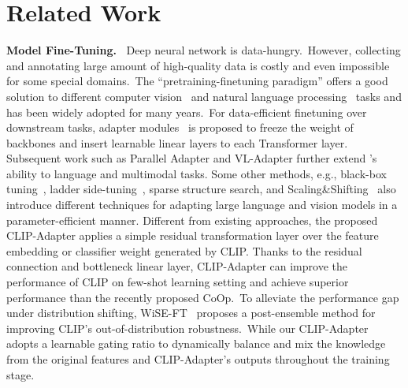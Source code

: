 \documentclass[default,iicol]{sn-jnl}%
\theoremstyle{thmstyleone}%
\theoremstyle{thmstyletwo}%
\theoremstyle{thmstylethree}%
\begin{document}
\section{Related Work}
\noindent\textbf{Model Fine-Tuning.~} Deep neural network is data-hungry.~However, collecting and annotating large amount of high-quality data is costly and even impossible for some special domains.~The ``pretraining-finetuning paradigm'' offers a good solution to different computer vision~\cite{krizhevsky2012imagenet,simonyan2015very,he2016deep} and natural language processing~\cite{devlin2019bert,dong2019unified,conneau2020unsupervised} tasks and has been widely adopted for many years.~For data-efficient finetuning over downstream tasks, adapter modules~\cite{houlsby2019parameter} is proposed to freeze the weight of backbones and insert learnable linear layers to each Transformer layer. Subsequent work such as Parallel Adapter \cite{he2022towards} and VL-Adapter \cite{sung2022vl} further extend \cite{houlsby2019parameter}'s ability to language and multimodal tasks. 
Some other methods, e.g., black-box tuning~\cite{sun2022black}, ladder side-tuning~\cite{sung2022lst}, sparse structure search\cite{hu2022sparse}, and Scaling\&Shifting~\cite{lian2022scaling} also introduce different techniques for adapting large language and vision models in a parameter-efficient manner.
Different from existing approaches, the proposed CLIP-Adapter applies a simple residual transformation layer over the feature embedding or classifier weight generated by CLIP. Thanks to the residual connection and bottleneck linear layer, CLIP-Adapter can improve the performance of CLIP on few-shot learning setting and achieve superior performance than the recently proposed CoOp.~To alleviate the performance gap under distribution shifting, WiSE-FT~\cite{wortsman2022robust} proposes a post-ensemble method for improving CLIP's out-of-distribution robustness.~While our CLIP-Adapter adopts a learnable gating ratio to dynamically balance and mix the knowledge from the original features and CLIP-Adapter's outputs throughout the training stage.
\end{document}
